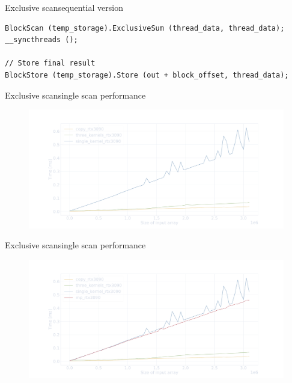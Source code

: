 \documentclass[aspectratio=169,compress]{beamer}
\begin{document}
\begin{frame}[fragile]{Exclusive scan}{sequential version}

\vspace{0.1in}

\begin{lstlisting}[showstringspaces=false]
BlockScan (temp_storage).ExclusiveSum (thread_data, thread_data);
__syncthreads ();

// Store final result
BlockStore (temp_storage).Store (out + block_offset, thread_data);
\end{lstlisting}
\end{frame}

\begin{frame}[fragile]{Exclusive scan}{single scan performance}
\centering
	\begin{figure}
		\includegraphics[width=\textwidth]{single_kernel_scan_perf.pdf}
	\end{figure}
\end{frame}

\begin{frame}[fragile]{Exclusive scan}{single scan performance}
\centering
	\begin{figure}
		\includegraphics[width=\textwidth]{single_kernel_scan_perf_mp.pdf}
	\end{figure}
\end{frame}
\end{document}
